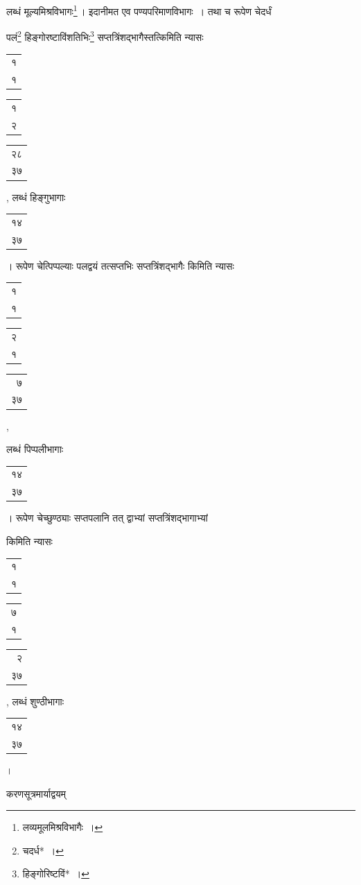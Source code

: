\documentclass[10pt, openany]{book}
\begin{document}
{{{लब्धं मूल्यमिश्रविभागः\renewcommand{\thefootnote}{\s ३}\footnote{\s लव्यमूलमिश्रविभागैः~।}\,। इदानीमत एव पण्यपरिमाणविभागः~। तथा च
रूपेण चेदर्धं}
{पलं\renewcommand{\thefootnote}{\s ४}\footnote{\s चदर्ध*~।}  हिङ्गोरष्टाविंशतिभिः\renewcommand{\thefootnote}{\s ५}\footnote{\s हिङ्गोरिष्टविं*~।}  सप्तत्रिंशद्भागैस्तत्किमिति न्यासः\textemdash
\begin{tabular}{r|}१ \\१\end{tabular}\begin{tabular}{r|} १\\ २\end{tabular}\begin{tabular}{r}२८ \\३७\end{tabular}, लब्धं हिङ्गुभागाः\begin{tabular}{r}१४\\ ३७\end{tabular}। रूपेण चेत्पिप्पल्याः पलद्वयं तत्सप्तभिः सप्तत्रिंशद्भागैः
किमिति न्यासः\textendash \,\begin{tabular}{r|}१\\ १\end{tabular}\begin{tabular}{r|} २\\ १\end{tabular}\begin{tabular}{r} ७\\ ३७\end{tabular},}
{लब्धं पिप्पलीभागाः\begin{tabular}{r}१४\\ ३७\end{tabular}। रूपेण चेच्छुण्ठ्याः सप्तपलानि तत् द्वाभ्यां
सप्तत्रिंशद्भागाभ्यां}
{किमिति न्यासः\textendash \,\begin{tabular}{r|}१\\ १\end{tabular}\begin{tabular}{r|}७ \\१ \end{tabular}\begin{tabular}{r}२ \\३७\end{tabular}, लब्धं शुण्ठीभागाः\begin{tabular}{r}१४\\ ३७\end{tabular}।}
\vspace{3mm}

{करणसूत्रमार्याद्वयम्\textemdash}

}}
\end{document}
